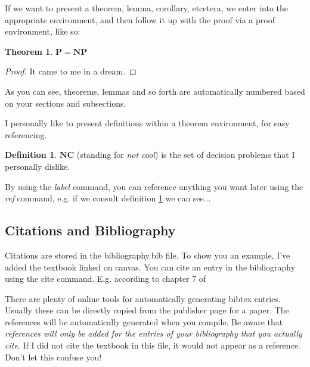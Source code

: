 \documentclass{article}
\theoremstyle{definition}
\newtheorem{definition}{Definition}[section]
\theoremstyle{plain}
\theoremstyle{plain}
\newtheorem{theorem}{Theorem}[section]
\begin{document}
If we want to present a theorem, lemma, corollary, etcetera, we enter into the appropriate environment, and then follow it up with the proof via a proof environment, like so:

\begin{theorem}
    $\mathbf{P} = \mathbf{NP}$
\end{theorem}

\begin{proof}
    It came to me in a dream.
\end{proof}

As you can see, theorems, lemmas and so forth are automatically numbered based on your sections and subsections. 

I personally like to present definitions within a theorem environment, for easy referencing.
\begin{definition}\label{NC}
    $\mathbf{NC}$ (standing for \emph{not cool}) is the set of decision problems that I personally dislike. 
\end{definition}

By using the \emph{label} command, you can reference anything you want later using the \emph{ref} command, e.g. if we consult definition \ref{NC} we can see...

\subsection{Citations and Bibliography}

Citations are stored in the bibliography.bib file. To show you an example, I've added the textbook linked on canvas. You can cite an entry in the bibliography using the cite command. E.g. according to chapter 7 of 

There are plenty of online tools for automatically generating bibtex entries. Usually these can be directly copied from the publisher page for a paper. The references will be automatically generated when you compile. Be aware that \emph{references will only be added for the entries of your bibliography that you actually cite}. If I did not cite the textbook in this file, it would not appear as a reference. Don't let this confuse you!
\printbibliography
\end{document}
